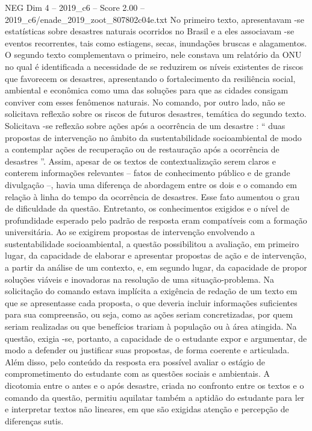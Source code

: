 \begin{textsample}{NEG Dim 4 – 2019\_c6 – Score 2.00 – 2019\_c6/enade\_2019\_zoot\_807802c04e.txt}
No primeiro texto, apresentavam -se estatísticas sobre desastres naturais ocorridos no Brasil e a eles associavam -se eventos recorrentes, tais como estiagens, secas, inundações bruscas e alagamentos.
O segundo texto complementava o primeiro, nele constava um relatório da ONU no qual é identificada a necessidade de se reduzirem os níveis existentes de riscos que favorecem os desastres, apresentando o fortalecimento da resiliência social, ambiental e econômica como uma das soluções para que as cidades consigam conviver com esses fenômenos naturais.
No comando, por outro lado, não se solicitava reflexão sobre os riscos de futuros desastres, temática do segundo texto.
Solicitava -se reflexão sobre ações após a ocorrência de um desastre : “ duas propostas de intervenção no âmbito da sustentabilidade socioambiental de modo a contemplar ações de recuperação ou de restauração após a ocorrência de desastres ”.
Assim, apesar de os textos de contextualização serem claros e conterem informações relevantes – fatos de conhecimento público e de grande divulgação –, havia uma diferença de abordagem entre os dois e o comando em relação à linha do tempo da ocorrência de desastres.
Esse fato aumentou o grau de dificuldade da questão.
Entretanto, os conhecimentos exigidos e o nível de profundidade esperado pelo padrão de resposta eram compatíveis com a formação universitária.
Ao se exigirem propostas de intervenção envolvendo a sustentabilidade socioambiental, a questão possibilitou a avaliação, em primeiro lugar, da capacidade de elaborar e apresentar propostas de ação e de intervenção, a partir da análise de um contexto, e, em segundo lugar, da capacidade de propor soluções viáveis e inovadoras na resolução de uma situação-problema.
Na solicitação do comando estava implícita a exigência de redação de um texto em que se apresentasse cada proposta, o que deveria incluir informações suficientes para sua compreensão, ou seja, como as ações seriam concretizadas, por quem seriam realizadas ou que benefícios trariam à população ou à área atingida.
Na questão, exigia -se, portanto, a capacidade de o estudante expor e argumentar, de modo a defender ou justificar suas propostas, de forma coerente e articulada.
Além disso, pelo conteúdo da resposta era possível avaliar o estágio de comprometimento do estudante com as questões sociais e ambientais.
A dicotomia entre o antes e o após desastre, criada no confronto entre os textos e o comando da questão, permitiu aquilatar também a aptidão do estudante para ler e interpretar textos não lineares, em que são exigidas atenção e percepção de diferenças sutis.

\end{textsample}
